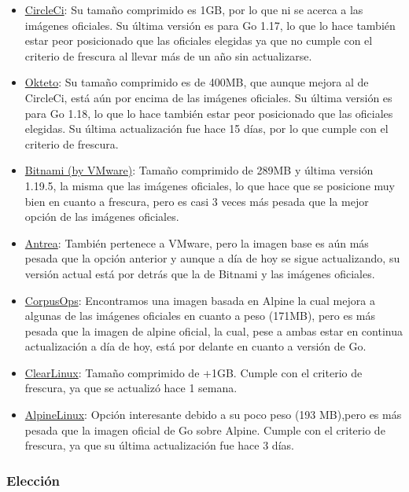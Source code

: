 \begin{itemize}
\item
  \href{https://hub.docker.com/r/circleci/golang}{CircleCi}: Su tamaño
  comprimido es 1GB, por lo que ni se acerca a las imágenes oficiales.
  Su última versión es para Go 1.17, lo que lo hace también estar peor
  posicionado que las oficiales elegidas ya que no cumple con el
  criterio de frescura al llevar más de un año sin actualizarse.
\item
  \href{https://hub.docker.com/r/okteto/golang}{Okteto}: Su tamaño
  comprimido es de 400MB, que aunque mejora al de CircleCi, está aún por
  encima de las imágenes oficiales. Su última versión es para Go 1.18,
  lo que lo hace también estar peor posicionado que las oficiales
  elegidas. Su última actualización fue hace 15 días, por lo que cumple
  con el criterio de frescura.
\item
  \href{https://hub.docker.com/r/bitnami/golang}{Bitnami (by VMware)}:
  Tamaño comprimido de 289MB y última versión 1.19.5, la misma que las
  imágenes oficiales, lo que hace que se posicione muy bien en cuanto a
  frescura, pero es casi 3 veces más pesada que la mejor opción de las
  imágenes oficiales.
\item
  \href{https://hub.docker.com/r/antrea/golang}{Antrea}: También
  pertenece a VMware, pero la imagen base es aún más pesada que la
  opción anterior y aunque a día de hoy se sigue actualizando, su
  versión actual está por detrás que la de Bitnami y las imágenes
  oficiales.
\item
  \href{https://hub.docker.com/r/corpusops/golang}{CorpusOps}:
  Encontramos una imagen basada en Alpine la cual mejora a algunas de
  las imágenes oficiales en cuanto a peso (171MB), pero es más pesada
  que la imagen de alpine oficial, la cual, pese a ambas estar en
  continua actualización a día de hoy, está por delante en cuanto a
  versión de Go.
\item
  \href{https://hub.docker.com/r/clearlinux/golang}{ClearLinux}: Tamaño
  comprimido de +1GB. Cumple con el criterio de frescura, ya que se
  actualizó hace 1 semana.
\item
  \href{https://hub.docker.com/r/alpinelinux/golang}{AlpineLinux}:
  Opción interesante debido a su poco peso (193 MB),pero es más pesada
  que la imagen oficial de Go sobre Alpine. Cumple con el criterio de
  frescura, ya que su última actualización fue hace 3 días.
\end{itemize}

\subsubsection{Elección}

